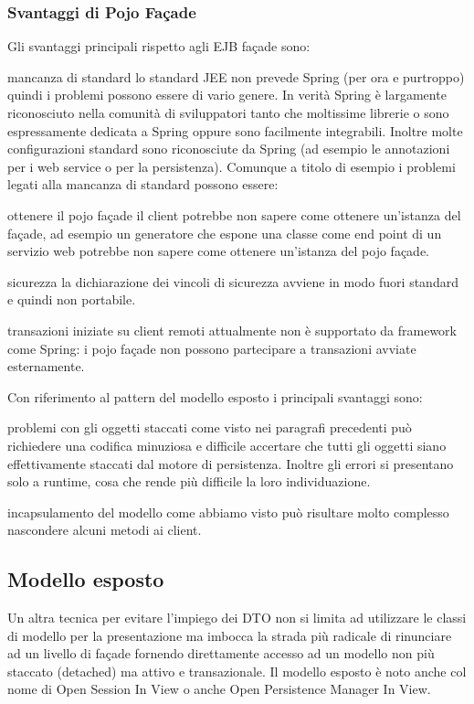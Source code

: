 \subsubsection{Svantaggi di Pojo Façade}
Gli svantaggi principali rispetto agli EJB façade sono:
\begin{description*}
\item[mancanza di standard] lo standard JEE non prevede Spring (per ora e purtroppo) quindi i problemi possono essere di vario genere. In verità Spring è largamente riconosciuto nella comunità di sviluppatori tanto che  moltissime librerie o sono espressamente dedicata a Spring oppure sono facilmente integrabili. Inoltre molte configurazioni standard sono riconosciute da Spring (ad esempio le annotazioni per i web service o per la persistenza). Comunque a titolo di esempio i problemi legati alla mancanza di standard possono essere:
   \begin{description*}
     \item[ottenere il pojo façade] il client potrebbe non sapere come ottenere un'istanza del façade, ad esempio un generatore che espone una classe come end point di un servizio web potrebbe non sapere come ottenere un'istanza del pojo façade.
     \item[sicurezza] la dichiarazione dei vincoli di sicurezza avviene in modo fuori standard e quindi non portabile.
    \end{description*}
\item[transazioni iniziate su client remoti] attualmente non è supportato da framework come Spring: i pojo façade non possono partecipare a transazioni avviate esternamente.
\end{description*}

Con riferimento al pattern del modello esposto i principali svantaggi sono:
  \begin{description*}
    \item[problemi con gli oggetti staccati] come visto nei paragrafi precedenti può richiedere una codifica minuziosa e difficile accertare che tutti gli oggetti siano effettivamente staccati dal motore di persistenza. Inoltre gli errori si presentano solo a runtime, cosa che rende più difficile la loro individuazione.
   \item[incapsulamento del modello] come abbiamo visto può risultare molto complesso nascondere alcuni metodi ai client.

  \end{description*}

\subsection{Modello esposto}
Un altra tecnica per evitare l'impiego dei DTO non si limita ad utilizzare le classi di modello per la presentazione ma imbocca la strada più radicale di rinunciare ad un livello di façade fornendo direttamente accesso ad un modello non più staccato (detached) ma attivo e transazionale. 
Il modello esposto è noto anche col nome di Open Session In View o anche Open Persistence Manager In View.

